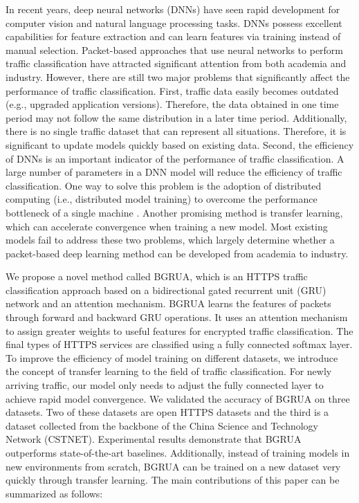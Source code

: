 \documentclass[preprint,12pt]{elsarticle}
\begin{document}
In recent years, deep neural networks (DNNs) have seen rapid development for computer vision and natural language processing tasks.
DNNs possess excellent capabilities for feature extraction and can learn features via training instead of manual selection. Packet-based approaches that use neural networks to perform traffic classification have attracted significant attention from both academia and industry. However, there are still two major problems that significantly affect the performance of traffic classification. First, traffic data easily becomes outdated (e.g., upgraded application versions). Therefore, the data obtained in one time period may not follow the same distribution in a later time period. Additionally, there is no single traffic dataset that can represent all situations. Therefore, it is significant to update models quickly based on existing data. Second, the efficiency of DNNs is an important indicator of the performance of traffic classification. A large number of parameters in a DNN model will reduce the efficiency of traffic classification. One way to solve this problem is the adoption of distributed computing (i.e., distributed model training) to overcome the performance bottleneck of a single machine \cite{Kenli3}\cite{caspmv:}. Another promising method is transfer learning, which can accelerate convergence when training a new model. Most existing models fail to address these two problems, which largely determine whether a packet-based deep learning method can be developed from academia to industry.

We propose a novel method called BGRUA, which is an HTTPS traffic classification approach based on a bidirectional gated recurrent unit (GRU) network and an attention mechanism. BGRUA learns the features of packets through forward and backward GRU operations. It uses an attention mechanism to assign greater weights to useful features for encrypted traffic classification.
The final types of HTTPS services are classified using a fully connected softmax layer. To improve the efficiency of model training on different datasets, we introduce the concept of transfer learning to the field of traffic classification. For newly arriving traffic, our model only needs to adjust the fully connected layer to achieve rapid model convergence. We validated the accuracy of BGRUA on three datasets. Two of these datasets are open HTTPS datasets and the third is a dataset collected from the backbone of the China Science and Technology Network (CSTNET). Experimental results demonstrate that BGRUA outperforms state-of-the-art baselines. Additionally, instead of training models in new environments from scratch, BGRUA can be trained on a new dataset very quickly through transfer learning. The main contributions of this paper can be summarized as follows:
\end{document}
